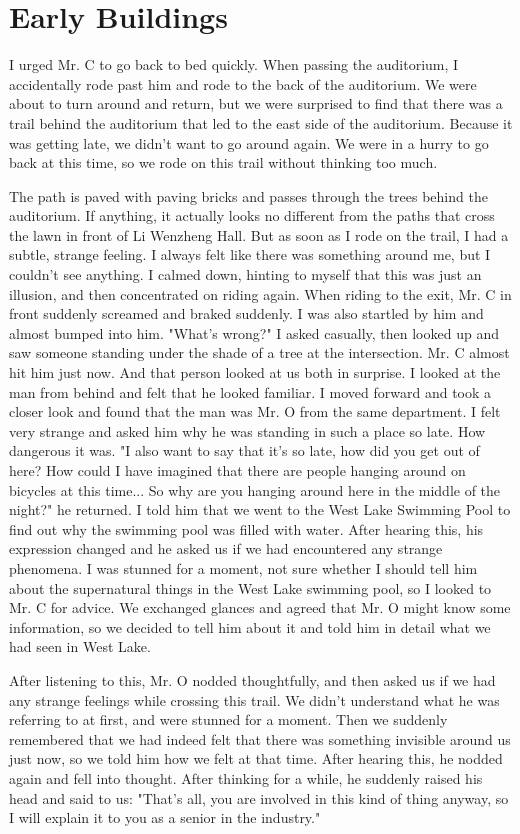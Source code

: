 \chapter{Early Buildings}

I urged Mr. C to go back to bed quickly. When passing the auditorium, I
accidentally rode past him and rode to the back of the auditorium.  We were
about to turn around and return, but we were surprised to find that there was a
trail behind the auditorium that led to the east side of the auditorium.
Because it was getting late, we didn't want to go around again. We were in a
hurry to go back at this time, so we rode on this trail without thinking too
much.

The path is paved with paving bricks and passes through the trees behind the
auditorium. If anything, it actually looks no different from the paths that
cross the lawn in front of Li Wenzheng Hall.  But as soon as I rode on the
trail, I had a subtle, strange feeling. I always felt like there was something
around me, but I couldn't see anything. I calmed down, hinting to myself that
this was just an illusion, and then concentrated on riding again.  When riding
to the exit, Mr. C in front suddenly screamed and braked suddenly. I was also
startled by him and almost bumped into him.  "What's wrong?" I asked casually,
then looked up and saw someone standing under the shade of a tree at the
intersection. Mr. C almost hit him just now. And that person looked at us both
in surprise.  I looked at the man from behind and felt that he looked familiar.
I moved forward and took a closer look and found that the man was Mr. O from
the same department.  I felt very strange and asked him why he was standing in
such a place so late. How dangerous it was.  "I also want to say that it's so
late, how did you get out of here? How could I have imagined that there are
people hanging around on bicycles at this time... So why are you hanging around
here in the middle of the night?" he returned.  I told him that we went to the
West Lake Swimming Pool to find out why the swimming pool was filled with
water.  After hearing this, his expression changed and he asked us if we had
encountered any strange phenomena.  I was stunned for a moment, not sure
whether I should tell him about the supernatural things in the West Lake
swimming pool, so I looked to Mr. C for advice. We exchanged glances and agreed
that Mr. O might know some information, so we decided to tell him about it and
told him in detail what we had seen in West Lake.

After listening to this, Mr. O nodded thoughtfully, and then asked us if we had
any strange feelings while crossing this trail.  We didn't understand what he
was referring to at first, and were stunned for a moment. Then we suddenly
remembered that we had indeed felt that there was something invisible around us
just now, so we told him how we felt at that time.  After hearing this, he
nodded again and fell into thought. After thinking for a while, he suddenly
raised his head and said to us: "That's all, you are involved in this kind of
thing anyway, so I will explain it to you as a senior in the industry."

